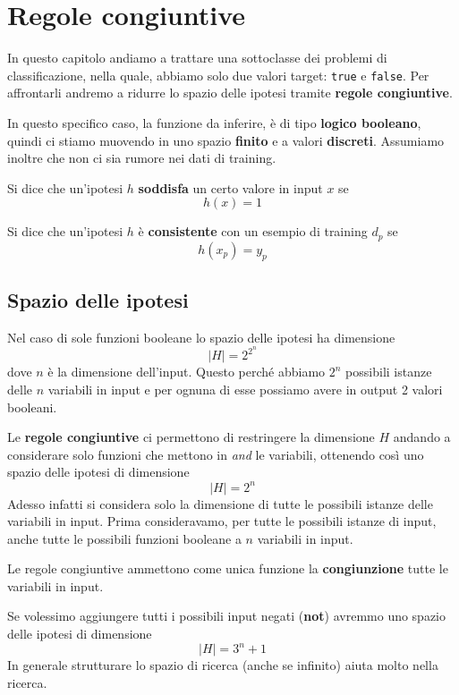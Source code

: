 \chapter{Regole congiuntive}
In questo capitolo andiamo a trattare una sottoclasse dei problemi di classificazione, nella quale, abbiamo solo due
valori target: \verb|true| e \verb|false|. Per affrontarli andremo a ridurre lo spazio delle ipotesi tramite
\textbf{regole congiuntive}.

In questo specifico caso, la funzione da inferire, \`e di tipo \textbf{logico booleano}, quindi ci stiamo muovendo in uno
spazio \textbf{finito} e a valori \textbf{discreti}. Assumiamo inoltre che non ci sia rumore nei dati di training.

\begin{definition}
	Si dice che un'ipotesi $h$ \textbf{soddisfa} un certo valore in input $x$ se
	\[ h(x) = 1 \]
\end{definition}

\begin{definition}\label{def: consistente}
	Si dice che un'ipotesi $h$ \`e \textbf{consistente} con un esempio di training $d_p$ se
	\[ h(x_p) = y_p \]
\end{definition}

\section{Spazio delle ipotesi}
Nel caso di sole funzioni booleane lo spazio delle ipotesi ha dimensione
\[ |H| = 2^{2^n} \]
dove $n$ \`e la dimensione dell'input. Questo perch\'e abbiamo $2^n$ possibili istanze delle $n$ variabili in input e
per ognuna di esse possiamo avere in output 2 valori booleani.

Le \textbf{regole congiuntive} ci permettono di restringere la dimensione $H$ andando a considerare solo funzioni che mettono
in \emph{and} le variabili, ottenendo cos\`i uno spazio delle ipotesi di dimensione
\[ |H| = 2^n \]
Adesso infatti si considera solo la dimensione di tutte le possibili istanze delle variabili in input. Prima consideravamo,
per tutte le possibili istanze di input, anche tutte le possibili funzioni booleane a $n$ variabili in input.

Le regole congiuntive ammettono come unica funzione la \textbf{congiunzione} tutte le variabili in input.

Se volessimo aggiungere tutti i possibili input negati (\textbf{not}) avremmo uno spazio delle ipotesi di dimensione
\[ |H| = 3^n + 1 \]
In generale strutturare lo spazio di ricerca (anche se infinito) aiuta molto nella ricerca.

